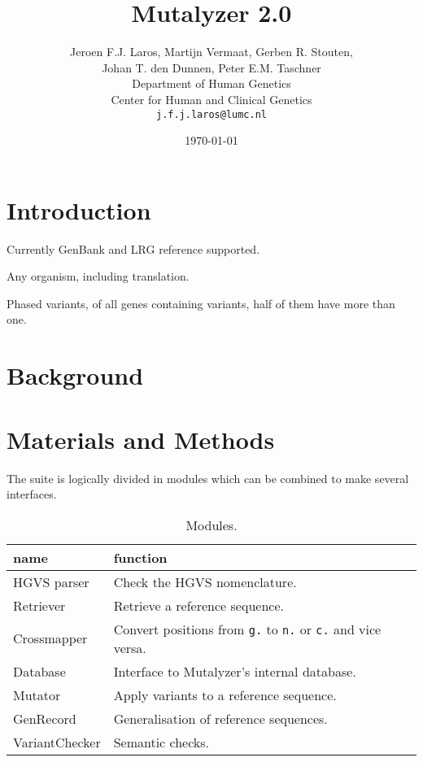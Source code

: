 \documentclass{article}
\title{\Huge Mutalyzer 2.0}
\author{Jeroen F.J. Laros, Martijn Vermaat, Gerben R. Stouten,\\
  Johan T. den Dunnen, Peter E.M. Taschner
  \vspace{10pt}\\
  Department of Human Genetics\\
  Center for Human and Clinical Genetics\\
  \texttt{j.f.j.laros@lumc.nl}}
\date{\today}
\begin{document}
\maketitle

\begin{abstract} \noindent
\end{abstract}

\section{Introduction}\label{introduction}
\cite{Mutalyzer}
\cite{HGVS}

Currently GenBank and LRG reference supported.

Any organism, including translation.

Phased variants, of all genes containing variants, half of them have more than
one.

\section{Background}\label{background}

\section{Materials and Methods}

The suite is logically divided in modules which can be combined to make several
interfaces.

\begin{table}[]
  \begin{center}
    \caption{Modules.}
    \begin{tabular}{l|l}
      name           & function\\
      \hline
      HGVS parser    & Check the HGVS nomenclature.\\
      Retriever      & Retrieve a reference sequence.\\
      Crossmapper    & Convert positions from \texttt{g.} to \texttt{n.} or
        \texttt{c.} and vice versa.\\
      Database       & Interface to Mutalyzer's internal database.\\
      Mutator        & Apply variants to a reference sequence.\\
      GenRecord      & Generalisation of reference sequences.\\
      VariantChecker & Semantic checks.
    \end{tabular}
  \end{center}
  \label{tab:modules}
\end{table}
\end{document}
